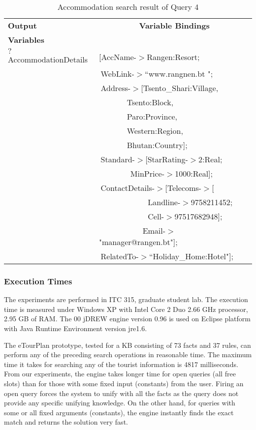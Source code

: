 \begin{table} [tbph]
\caption{Accommodation search result of Query 4}
\centering
\footnotesize
\begin{tabular}{|l|l|}
\hline
 \textbf{Output} &$~~~~~~~~~~~~~~~~~~~~~~~$\textbf{Variable Bindings} \\
 \textbf{Variables}&                \\
\hline
 $?$AccommodationDetails&[AccName-$>$Rangen:Resort; \\
           &$~$WebLink-$>$``www.rangnen.bt "; \\
		    &$~$Address-$>$[Tsento\_Shari:Village, \\
		    &$~~~~~~~~~~~~~~~~$Tsento:Block, \\
		&$~~~~~~~~~~~~~~~~$Paro:Province, \\
		&$~~~~~~~~~~~~~~~~$Western:Region,\\
        &$~~~~~~~~~~~~~~~~$Bhutan:Country];\\
		   &$~$Standard-$>$[StarRating-$>$2:Real; \\
           &$~~~~~~~~~~~~~~~~~~$MinPrice-$>$1000:Real];\\
           &$~$ContactDetails-$>[$Telecoms-$>$[\\
            &$~~~~~~~~~~~~~~~~~~~~~~~~~~~~$Landline-$>$9758211452;\\
		        &$~~~~~~~~~~~~~~~~~~~~~~~~~~~~$Cell-$>$97517682948];\\
            &$~~~~~~~~~~~~~~~~~~~~~~~~~$Email-$>$"manager@rangen.bt"]; \\		   
          &$~$RelatedTo-$>$``Holiday\_Home:Hotel"];\\      
\hline
\end{tabular} 
\end{table} 
 
\subsubsection{Execution Times}
\hspace{0.3in}The experiments are performed in ITC 315, graduate student lab. The execution time is measured under Windows XP with Intel Core 2 Duo 2.66 GHz processor, 2.95 GB of RAM. The 00 jDREW engine version 0.96 is used on Eclipse platform with Java Runtime Environment version jre1.6.

\hspace{0.3in}The eTourPlan prototype, tested for a KB consisting of 73 facts and 37 rules, can perform any of the preceding search operations in reasonable time. The maximum time it takes for searching any of the tourist information is 4817 milliseconds. From our experiments, the engine takes longer time for open queries (all free slots) than for those with some fixed input (constants) from the user. Firing an open query forces the system to unify with all the facts as the query does not provide any specific unifying knowledge. On the other hand, for queries with some or all fixed arguments (constants), the engine instantly finds the exact match and returns the solution very fast.

